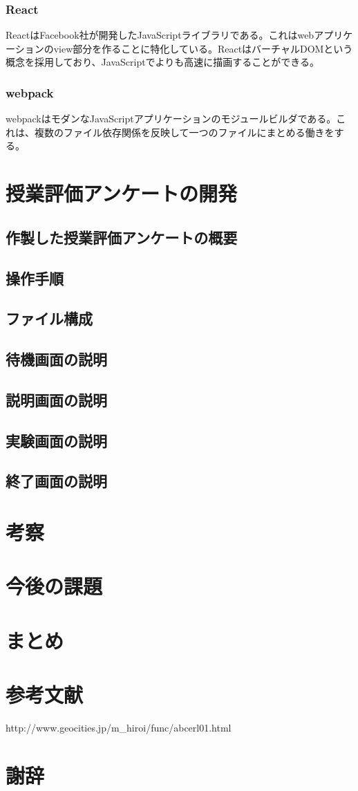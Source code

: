 \documentclass[11pt,a4paper]{jsarticle}
\begin{document}
\subsubsection{React}
ReactはFacebook社が開発したJavaScriptライブラリである。これはwebアプリケーションのview部分を作ることに特化している。ReactはバーチャルDOMという概念を採用しており、JavaScriptでよりも高速に描画することができる。
\subsubsection{webpack}
webpackはモダンなJavaScriptアプリケーションのモジュールビルダである。これは、複数のファイル依存関係を反映して一つのファイルにまとめる働きをする。
\section{授業評価アンケートの開発}
\subsection{作製した授業評価アンケートの概要}
\subsection{操作手順}
\subsection{ファイル構成}
\subsection{待機画面の説明}
\subsection{説明画面の説明}
\subsection{実験画面の説明}
\subsection{終了画面の説明}
\section{考察}
\section{今後の課題}
\section{まとめ}
\section{参考文献}
http://www.geocities.jp/m_hiroi/func/abcerl01.html
\section{謝辞}
%
%
\end{document}
